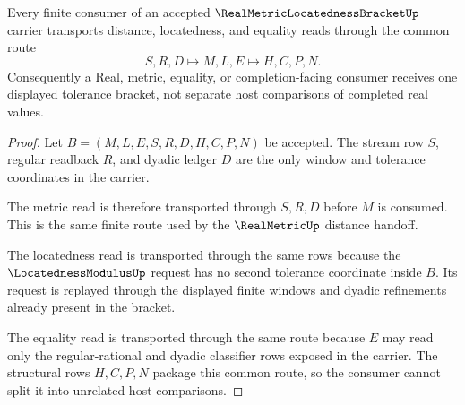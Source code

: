 \begin{theorem}
\label{thm:real-metric-locatedness-bracket-window-transport}
Every finite consumer of an accepted $\RealMetricLocatednessBracketUp$ carrier transports distance, locatedness, and equality reads through the common route
$$
S,R,D \longmapsto M,L,E \longmapsto H,C,P,N .
$$
Consequently a Real, metric, equality, or completion-facing consumer receives one displayed tolerance bracket, not separate host comparisons of completed real values.
\end{theorem}
\begin{proof}
Let $B=(M,L,E,S,R,D,H,C,P,N)$ be accepted. The stream row $S$, regular readback $R$, and dyadic ledger $D$ are the only window and tolerance coordinates in the carrier.

The metric read is therefore transported through $S,R,D$ before $M$ is consumed. This is the same finite route used by the $\RealMetricUp$ distance handoff.

The locatedness read is transported through the same rows because the $\LocatednessModulusUp$ request has no second tolerance coordinate inside $B$. Its request is replayed through the displayed finite windows and dyadic refinements already present in the bracket.

The equality read is transported through the same route because $E$ may read only the regular-rational and dyadic classifier rows exposed in the carrier. The structural rows $H,C,P,N$ package this common route, so the consumer cannot split it into unrelated host comparisons.
\end{proof}

